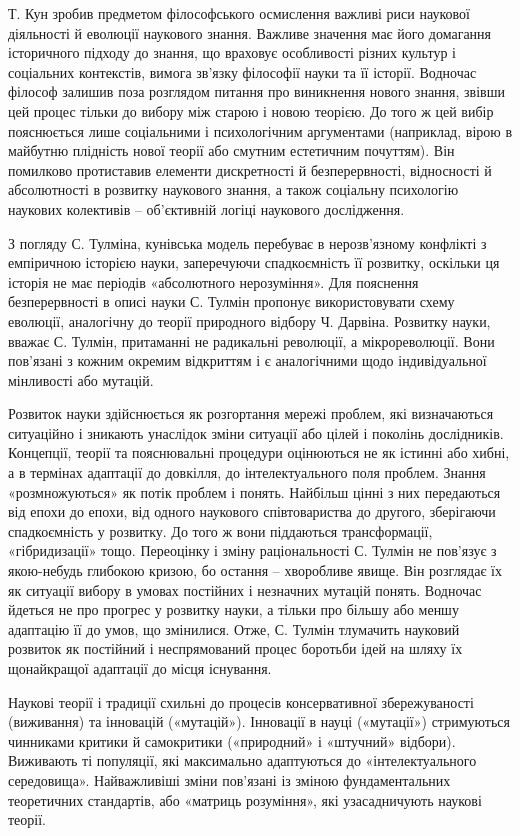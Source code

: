 Т. Кун зробив предметом філософського осмислення важливі риси наукової
діяльності й еволюції наукового знання. Важливе значення має його домагання
історичного підходу до знання, що враховує особливості різних культур і
соціальних контекстів, вимога зв’язку філософії науки та її історії. Водночас
філософ залишив поза розглядом питання про виникнення нового знання,
звівши цей процес тільки до вибору між старою і новою теорією. До того ж цей
вибір пояснюється лише соціальними і психологічним аргументами (наприклад,
вірою в майбутню плідність нової теорії або смутним естетичним почуттям).
Він помилково протиставив елементи дискретності й безперервності,
відносності й абсолютності в розвитку наукового знання, а також соціальну
психологію наукових колективів – об’єктивній логіці наукового дослідження.

З погляду С. Тулміна, кунівська модель перебуває в нерозв’язному
конфлікті з емпіричною історією науки, заперечуючи спадкоємність її
розвитку, оскільки ця історія не має періодів «абсолютного нерозуміння». Для
пояснення безперервності в описі науки С. Тулмін пропонує використовувати
схему еволюції, аналогічну до теорії природного відбору Ч. Дарвіна. Розвитку
науки, вважає С. Тулмін, притаманні не радикальні революції, а
мікрореволюції. Вони пов’язані з кожним окремим відкриттям і є аналогічними
щодо індивідуальної мінливості або мутацій.

Розвиток науки здійснюється як розгортання мережі проблем, які
визначаються ситуаційно і зникають унаслідок зміни ситуації або цілей і
поколінь дослідників. Концепції, теорії та пояснювальні процедури оцінюються
не як істинні або хибні, а в термінах адаптації до довкілля, до інтелектуального
поля проблем. Знання «розмножуються» як потік проблем і понять. Найбільш
цінні з них передаються від епохи до епохи, від одного наукового
співтовариства до другого, зберігаючи спадкоємність у розвитку. До того ж
вони піддаються трансформації, «гібридизації» тощо. Переоцінку і зміну
раціональності С. Тулмін не пов’язує з якою-небудь глибокою кризою, бо
остання – хворобливе явище. Він розглядає їх як ситуації вибору в умовах
постійних і незначних мутацій понять. Водночас йдеться не про прогрес у
розвитку науки, а тільки про більшу або меншу адаптацію її до умов, що
змінилися. Отже, С. Тулмін тлумачить науковий розвиток як постійний і
неспрямований процес боротьби ідей на шляху їх щонайкращої адаптації до
місця існування.

Наукові теорії і традиції схильні до процесів консервативної збережуваності
(виживання) та інновацій («мутацій»). Інновації в науці («мутації»)
стримуються чинниками критики й самокритики («природний» і «штучний»
відбори). Виживають ті популяції, які максимально адаптуються до
«інтелектуального середовища». Найважливіші зміни пов’язані із зміною
фундаментальних теоретичних стандартів, або «матриць розуміння», які
узасадничують наукові теорії.

